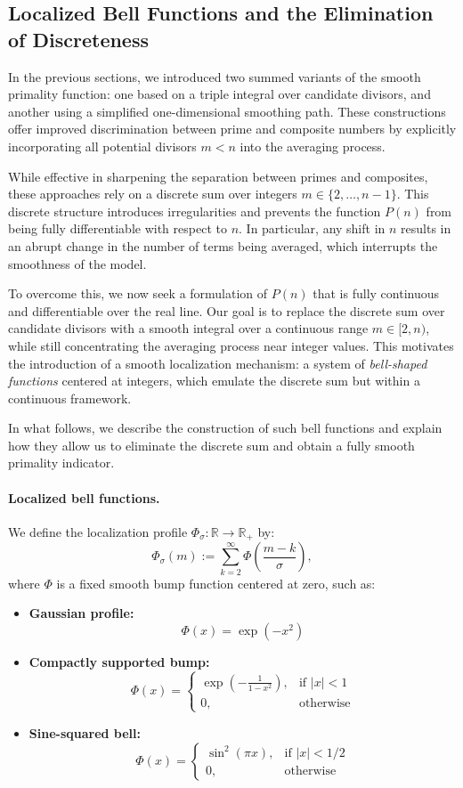 \documentclass[12pt]{article}
\theoremstyle{definition}
\theoremstyle{plain}
\theoremstyle{remark}
\begin{document}
\subsection{Localized Bell Functions and the Elimination of Discreteness}

In the previous sections, we introduced two summed variants of the smooth primality function: one based on a triple integral over candidate divisors, and another using a simplified one-dimensional smoothing path. These constructions offer improved discrimination between prime and composite numbers by explicitly incorporating all potential divisors \( m < n \) into the averaging process.

While effective in sharpening the separation between primes and composites, these approaches rely on a discrete sum over integers \( m \in \{2, \dots, n-1\} \). This discrete structure introduces irregularities and prevents the function \( P(n) \) from being fully differentiable with respect to \( n \). In particular, any shift in \( n \) results in an abrupt change in the number of terms being averaged, which interrupts the smoothness of the model.

To overcome this, we now seek a formulation of \( P(n) \) that is fully continuous and differentiable over the real line. Our goal is to replace the discrete sum over candidate divisors with a smooth integral over a continuous range \( m \in [2, n) \), while still concentrating the averaging process near integer values. This motivates the introduction of a smooth localization mechanism: a system of \emph{bell-shaped functions} centered at integers, which emulate the discrete sum but within a continuous framework.

In what follows, we describe the construction of such bell functions and explain how they allow us to eliminate the discrete sum and obtain a fully smooth primality indicator.

\paragraph{Localized bell functions.}  
We define the localization profile \( \Phi_\sigma : \mathbb{R} \to \mathbb{R}_+ \) by:
\[
\Phi_\sigma(m) := \sum_{k=2}^{\infty} \Phi\left( \frac{m - k}{\sigma} \right),
\]
where \( \Phi \) is a fixed smooth bump function centered at zero, such as:

\begin{itemize}
  \item \textbf{Gaussian profile:}
  \[
  \Phi(x) = \exp(-x^2)
  \]
  \item \textbf{Compactly supported bump:}
  \[
  \Phi(x) =
  \begin{cases}
  \exp\left( -\frac{1}{1 - x^2} \right), & \text{if } |x| < 1 \\
  0, & \text{otherwise}
  \end{cases}
  \]
  \item \textbf{Sine-squared bell:}
  \[
  \Phi(x) =
  \begin{cases}
  \sin^2(\pi x), & \text{if } |x| < 1/2 \\
  0, & \text{otherwise}
  \end{cases}
  \]
\end{itemize}
\end{document}
